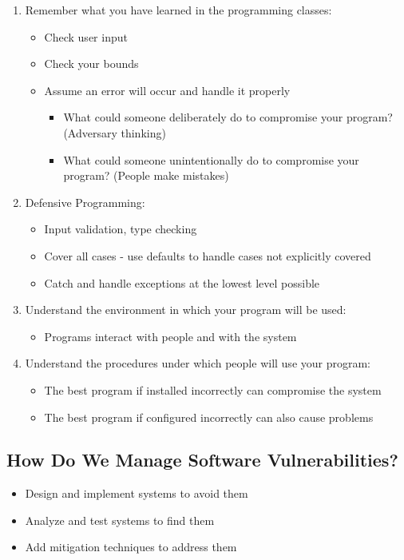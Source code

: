 \documentclass[11pt,a4paper]{article}
\begin{document}
\begin{enumerate}
    \item Remember what you have learned in the programming classes:
    \begin{itemize}
        \item Check user input
        \item Check your bounds
        \item Assume an error will occur and handle it properly
        \begin{itemize}
            \item What could someone deliberately do to compromise your program? (Adversary thinking)
            \item What could someone unintentionally do to compromise your program? (People make mistakes)
        \end{itemize}
    \end{itemize}
    
    \item Defensive Programming:
    \begin{itemize}
        \item Input validation, type checking
        \item Cover all cases - use defaults to handle cases not explicitly covered
        \item Catch and handle exceptions at the lowest level possible
    \end{itemize}
    
    \item Understand the environment in which your program will be used:
    \begin{itemize}
        \item Programs interact with people and with the system
    \end{itemize}
    
    \item Understand the procedures under which people will use your program:
    \begin{itemize}
        \item The best program if installed incorrectly can compromise the system
        \item The best program if configured incorrectly can also cause problems
    \end{itemize}
\end{enumerate}

\subsection{How Do We Manage Software Vulnerabilities?}
\begin{itemize}
    \item Design and implement systems to avoid them
    \item Analyze and test systems to find them
    \item Add mitigation techniques to address them
\end{itemize}
\end{document}
